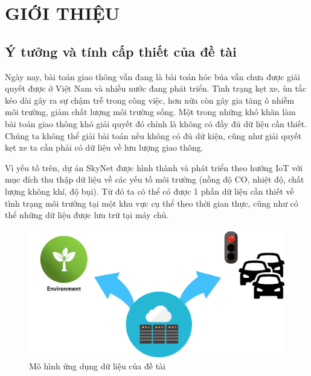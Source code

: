 
\chapter{GIỚI THIỆU}  %

\ifpdf
    \graphicspath{{Chapter1/Figs/Raster/}{Chapter1/Figs/PDF/}{Chapter1/Figs/}}
\else
    \graphicspath{{Chapter1/Figs/Vector/}{Chapter1/Figs/}}
\fi


\section{Ý tưởng và tính cấp thiết của đề tài}\label{section1.1}

Ngày nay, bài toán giao thông vẫn đang là bài toán hóc búa vẫn chưa được giải quyết được ở Việt Nam và nhiều nước đang phát triển. Tình trạng kẹt xe, ùn tắc kéo dài gây ra sự chậm trễ trong công việc, hơn nữa còn  gây gia tăng ô nhiễm môi trường, giảm chất lượng môi trường sống. Một trong những khó khăn làm bài toán giao thông khó giải quyết đó chính là không có đầy đủ dữ liệu cần thiết. Chúng ta không thể giải bài toán nếu không có đủ dữ kiện, cũng như giải quyết kẹt xe ta cần phải có dữ liệu về lưu lượng giao thông.

Vì yếu tố trên, dự án SkyNet được hình thành và phát triển theo hướng IoT với mục đích thu thập dữ liệu về các yếu tố môi trường (nồng độ CO, nhiệt độ, chất lượng không khí, độ bụi). Từ đó ta có thể có được 1 phần dữ liệu cần thiết về tình trạng môi trường tại một khu vực cụ thể theo thời gian thực, cũng như có thể những dữ liệu được lưu trữ tại máy chủ.

\begin{figure}[H] 
\centering    
\includegraphics[width=1.0\textwidth]{pic1}
\caption[Mô hình ứng dụng dữ liệu của đề tài]{Mô hình ứng dụng dữ liệu của đề tài}
\label{fig:pic1}
\end{figure}

